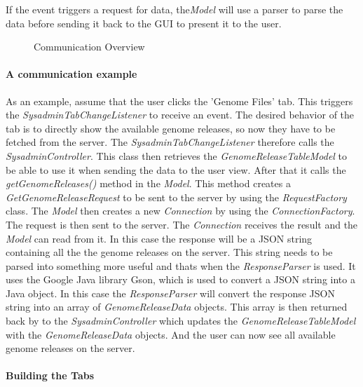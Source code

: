 If the event triggers a request for data, the\textit{Model} will use a parser to parse the data before sending it back to the GUI to present it to the user.


\begin{figure}[hbt!]
\caption{Communication Overview}
\label{fig:adm_com_view}
\end{figure}


\paragraph{A communication example}
\label{Communication example}

As an example, assume that the user clicks the 'Genome Files' tab.
This triggers the \textit{SysadminTabChangeListener} to receive an event. The desired behavior of the tab is to directly show the available genome releases, so now they  have to be fetched from the server. The \textit{SysadminTabChangeListener} therefore calls the \textit{SysadminController}.
This class then retrieves the \textit{GenomeReleaseTableModel} to be able to use it when sending the data to the user view.  After that it calls the \textit{getGenomeReleases()} method in the \textit{Model}. This method creates a \textit{GetGenomeReleaseRequest} to be sent to the server by using the \textit{RequestFactory} class. The \textit{Model} then creates a new \textit{Connection} by using the \textit{ConnectionFactory}. The request is then sent to the server. The \textit{Connection} receives the result and the \textit{Model} can read from it. In this case the response will be a JSON string containing all the the genome releases on the server. This string needs to be parsed into something more useful and thats when the \textit{ResponseParser} is used. It uses the Google Java library Gson, which is used to convert a JSON string into a Java object. In this case the \textit{ResponseParser} will convert the response JSON string into an array of \textit{GenomeReleaseData} objects. This array is then returned back by to the \textit{SysadminController} which updates the \textit{GenomeReleaseTableModel} with the \textit{GenomeReleaseData} objects. And the user can now see all available genome releases on the server.

\paragraph{Building the Tabs}
\label{Building the Tabs}

